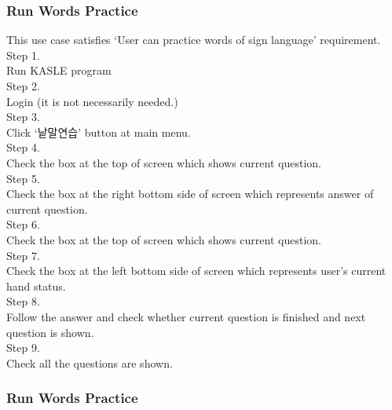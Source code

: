 \documentclass[10pt,journal,compsoc]{IEEEtran}
\begin{document}
\subsubsection{ Run Words Practice\\}
This use case satisfies ‘User can practice words of sign language’ requirement.
\\Step 1.
\\Run KASLE program
\\Step 2.
\\Login (it is not necessarily needed.)
\\Step 3.
\\Click ‘낱말연습’ button at main menu.
\\Step 4. 
\\Check the box at the top of screen which shows current question.
\\Step 5. 
\\Check the box at the right bottom side of screen which represents answer of current question.
\\Step 6.
\\Check the box at the top of screen which shows current question.
\\Step 7.
\\Check the box at the left bottom side of screen which represents user’s current hand status.
\\Step 8. 
\\Follow the answer and check whether current question is finished and next question is shown.
\\Step 9.
\\Check all the questions are shown.

\subsubsection{Run Words Practice\\}
\end{document}

